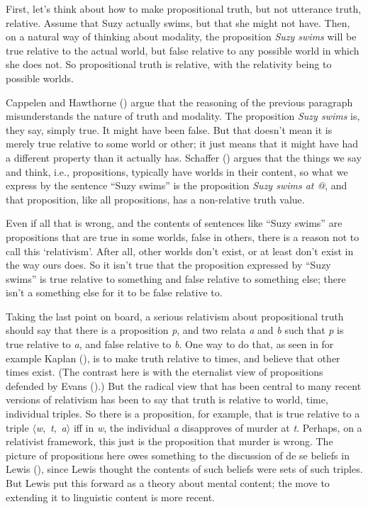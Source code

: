 \documentclass[
  10pt,
  letterpaper,
  DIV=11,
  numbers=noendperiod,
  twoside]{scrartcl}
\begin{document}
First, let's think about how to make propositional truth, but not
utterance truth, relative. Assume that Suzy actually swims, but that she
might not have. Then, on a natural way of thinking about modality, the
proposition \emph{Suzy swims} will be true relative to the actual world,
but false relative to any possible world in which she does not. So
propositional truth is relative, with the relativity being to possible
worlds.

Cappelen and Hawthorne ()
argue that the reasoning of the previous paragraph misunderstands the
nature of truth and modality. The proposition \emph{Suzy swims} is, they
say, simply true. It might have been false. But that doesn't mean it is
merely true relative to some world or other; it just means that it might
have had a different property than it actually has. Schaffer
() argues that the things we say and
think, i.e., propositions, typically have worlds in their content, so
what we express by the sentence ``Suzy swims'' is the proposition
\emph{Suzy swims at @}, and that proposition, like all propositions, has
a non-relative truth value.

Even if all that is wrong, and the contents of sentences like ``Suzy
swims'' are propositions that are true in some worlds, false in others,
there is a reason not to call this `relativism'. After all, other worlds
don't exist, or at least don't exist in the way ours does. So it isn't
true that the proposition expressed by ``Suzy swims'' is true relative
to something and false relative to something else; there isn't a
something else for it to be false relative to.

Taking the last point on board, a serious relativism about propositional
truth should say that there is a proposition \emph{p}, and two relata
\emph{a} and \emph{b} such that \emph{p} is true relative to \emph{a},
and false relative to \emph{b}. One way to do that, as seen in for
example Kaplan (), is to make truth
relative to times, and believe that other times exist. (The contrast
here is with the eternalist view of propositions defended by Evans
().) But the radical view that has been
central to many recent versions of relativism has been to say that truth
is relative to world, time, individual triples. So there is a
proposition, for example, that is true relative to a triple
\(\langle\)\emph{w},~\emph{t},~\emph{a}\(\rangle\) iff in \emph{w}, the
individual \emph{a} disapproves of murder at \emph{t}. Perhaps, on a
relativist framework, this just is the proposition that murder is wrong.
The picture of propositions here owes something to the discussion of de
se beliefs in Lewis (), since Lewis
thought the contents of such beliefs were sets of such triples. But
Lewis put this forward as a theory about mental content; the move to
extending it to linguistic content is more recent.
\end{document}
